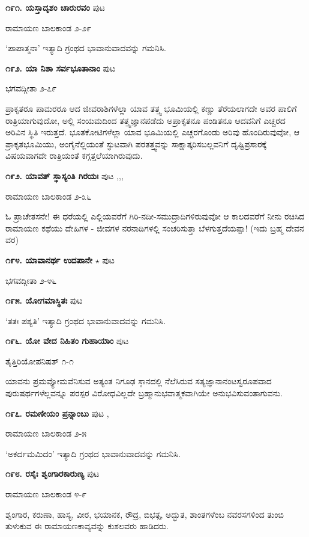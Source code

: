 \medskip
\noindent\textbf{೧೯೧. ಯಸ್ತಾದೃಶಂ ಚಾರುರವಂ} \hfill ಪುಟ \pageref{250}

\hfill ರಾಮಾಯಣ ಬಾಲಕಾಂಡ ೨-೨೯

`ಪಾಪಾತ್ಮನಾ' ಇತ್ಯಾದಿ ಗ್ರಂಥದ ಭಾವಾನುವಾದವನ್ನು ಗಮನಿಸಿ.

\medskip
\noindent\textbf{೧೯೨. ಯಾ ನಿಶಾ ಸರ್ವಭೂತಾನಾಂ} \hfill ಪುಟ \pageref{138}

\hfill ಭಗವದ್ಗೀತಾ ೨-೭೯

ಪ್ರಾಕೃತರೂ ಪಾಮರರೂ ಆದ ಜೀವರಾಶಿಗಳೆಲ್ಲಾ ಯಾವ ತತ್ತ್ವ ಭೂಮಿಯಲ್ಲಿ ಕಣ್ಣು ತೆರೆಯಲಾಗದೇ ಅವರ ಪಾಲಿಗೆ ರಾತ್ರಿಯಾಗುವುದೋ, ಅಲ್ಲಿ ಸಂಯಮದಿಂದ ತತ್ತ್ವಜ್ಞಾನಪಡೆದು ಅಪ್ರಾಕೃತನೂ ಪಂಡಿತನೂ ಆದವನಿಗೆ ಎಚ್ಚರದ ಅರಿವಿನ ಸ್ಥಿತಿ ಇರುತ್ತದೆ. ಭೂತಕೋಟಿಗಳೆಲ್ಲಾ ಯಾವ ಭೂಮಿಯಲ್ಲಿ ಎಚ್ಚರಗೊಂಡು ಅರಿವು ಹೊಂದಿರುವುವೋ, ಆ ಪ್ರಾಕೃತಭೂಮಿಯು, ಅಂಗೈನೆಲ್ಲಿಯಂತೆ ಸ್ಫುಟವಾಗಿ ಪರತತ್ತ್ವವನ್ನು ಸಾಕ್ಷಾತ್ಕರಿಸಬಲ್ಲವನಿಗೆ ದೃಷ್ಟಿಪ್ರಸಾರಕ್ಕೆ ವಿಷಯವಾಗದೇ ರಾತ್ರಿಯಂತೆ ಕಗ್ಗತ್ತಲೆಯಾಗಿರುವುದು.

\medskip
\noindent\textbf{೧೯೨. ಯಾವತ್ ಸ್ಥಾಸ್ಯಂತಿ ಗಿರಯಃ} \hfill ಪುಟ \pageref{158},\pageref{166},\pageref{208},\pageref{210}

\hfill ರಾಮಾಯಣ ಬಾಲಕಾಂಡ ೨-೩೬

ಓ ಪ್ರಾಚೇತಸನೇ! ಈ ಧರೆಯಲ್ಲಿ ಎಲ್ಲಿಯವರೆಗೆ ಗಿರಿ-ನದೀ-ಸಮುದ್ರಾದಿಗಳಿರುವುವೋ ಆ ಕಾಲದವರೆಗೆ ನೀನು ರಚಿಸಿದ ರಾಮಾಯಣ ಕಥೆಯು ದೇಹಿಗಳ - ಜೀವಗಳ ನರನಾಡಿಗಳಲ್ಲಿ ಸಂಚರಿಸುತ್ತಾ ಬೆಳಗುತ್ತದೆಯಪ್ಪಾ! (ಇದು ಬ್ರಹ್ಮ ದೇವನ ವರ)

\medskip
\noindent\textbf{೧೯೪. ಯಾವಾನರ್ಥ ಉದಪಾನೇ} $\star$ \hfill ಪುಟ \pageref{14}

\hfill ಭಗವದ್ಗೀತಾ ೨-೪೬

\medskip
\noindent\textbf{೧೯೫. ಯೋಗಮಾಸ್ಥಿತಃ} \hfill ಪುಟ \pageref{249}

\hfill `ತತಃ ಪಶ್ಯತಿ' ಇತ್ಯಾದಿ ಗ್ರಂಥದ ಭಾವಾನುವಾದವನ್ನು ಗಮನಿಸಿ.

\medskip
\noindent\textbf{೧೯೬. ಯೋ ವೇದ ನಿಹಿತಂ ಗುಹಾಯಾಂ} \hfill ಪುಟ \pageref{108}

\hfill ತೈತ್ತಿರಿಯೋಪನಿಷತ್ ೧-೧

ಯಾವನು ಪ್ರಮವ್ಯೋಮವೆನಿಸುವ ಅತ್ಯಂತ ನಿಗೂಢ ಸ್ಠಾನದಲ್ಲಿ ನೆಲೆಸಿರುವ ಸತ್ಯಜ್ಞಾನಾನಂಟಸ್ವರೂಪವಾದ ಪುರುಷರ್ಥಗಳೆಲ್ಲವನ್ನೂ ಪರಸ್ಪರ ವಿರೋಧವಿಲ್ಲದೇ ಬ್ರಹ್ಮಾನುಭವಾತ್ಮಕವಾಗಿಯೇ ಅನುಭವಿಸುವಂತಾಗುವನು.

\medskip
\noindent\textbf{೧೯೭. ರಮಣೀಯಂ ಪ್ರನ್ನಾಂಬು} \hfill ಪುಟ \pageref{165},\pageref{211}

\hfill ರಾಮಾಯಣ ಬಾಲಕಾಂಡ ೨-೫

`ಅಕರ್ದಮಮಿದಂ' ಇತ್ಯಾದಿ ಗ್ರಂಥದ ಭಾವಾನುವಾದವನ್ನು ಗಮನಿಸಿ.

\medskip
\noindent\textbf{೧೯೮. ರಸೈಃ ಶೃಂಗಾರಕಾರುಣ್ಯ} \hfill ಪುಟ \pageref{188}

\hfill ರಾಮಾಯಣ ಬಾಲಕಾಂಡ ೪-೯

ಶೃಂಗಾರ, ಕರುಣಾ, ಹಾಸ್ಯ, ವೀರ, ಭಯಾನಕ, ರೌದ್ರ, ಬಿಭತ್ಸ, ಅದ್ಭುತ, ಶಾಂತಗಳೆಂಬ ನವರಸಗಳಿಂದ ತುಂಬಿ ತುಳುಕುವ ಈ ರಾಮಾಯಣಕಾವ್ಯವನ್ನು ಕುಶಲವರು ಹಾಡಿದರು.

